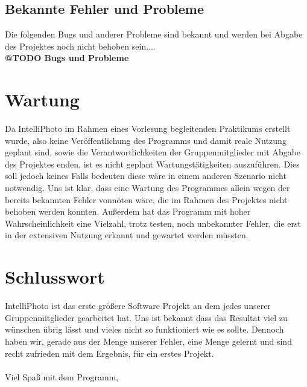 \documentclass[11pt,a4paper]{article}
\begin{document}
\subsection{Bekannte Fehler und Probleme}
Die folgenden Bugs und anderer Probleme sind bekannt und werden bei Abgabe des Projektes noch nicht behoben sein....\\
\textbf{@TODO Bugs und Probleme}




\section{Wartung}
Da IntelliPhoto im Rahmen eines Vorlesung begleitenden Praktikums erstellt wurde, also keine Veröffentlichung des Programms und damit reale Nutzung geplant sind, sowie die Verantwortlichkeiten der Gruppenmitglieder mit Abgabe des Projektes enden, ist es nicht geplant Wartungstätigkeiten auszuführen. Dies soll jedoch keines Falls bedeuten diese wäre in einem anderen Szenario nicht notwendig. Uns ist klar, dass eine Wartung des Programmes allein wegen der bereits bekannten Fehler vonnöten wäre, die im Rahmen des Projektes nicht behoben werden konnten. Außerdem hat das Programm mit hoher Wahrscheinlichkeit eine Vielzahl, trotz testen, noch unbekannter Fehler, die erst in der extensiven Nutzung erkannt und gewartet werden müssten.  


\section{Schlusswort}
IntelliPhoto ist das erste größere Software Projekt an dem jedes unserer Gruppenmitglieder gearbeitet hat. Uns ist bekannt dass das Resultat viel zu wünschen übrig lässt und vieles nicht so funktioniert wie es sollte. Dennoch haben wir, gerade aus der Menge unserer Fehler, eine Menge gelernt und sind recht zufrieden mit dem Ergebnis, für ein erstes Projekt.\\
\\
Viel Spaß mit dem Programm,\\
\end{document}
